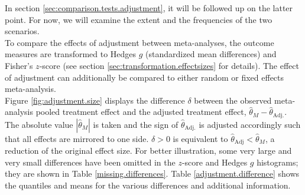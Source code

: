 In section \ref{sec:comparison.tests.adjustment}, it will be followed up on the latter point. For now, we will examine the extent and the frequencies of the two scenarios. \\
To compare the effects of adjustment between meta-analyses, the outcome measures are transformed to Hedges $g$ (standardized mean differences) and Fisher's $z$-score (see section \ref{sec:transformation.effectsizes} for details). The effect of adjustment can additionally be compared to either random or fixed effects meta-analysis. \\
Figure \ref{fig:adjustment.size} displays the difference $\delta$ between the observed meta-analysis pooled treatment effect and the adjusted treatment effect, $\hat{\theta}_M - \hat{\theta}_\textrm{Adj.}$. The absolute value $|\hat{\theta}_M|$ is taken and the sign of $\hat{\theta}_\textrm{Adj.}$ is adjusted accordingly such that all effects are mirrored to one side. $\delta > 0$ is equivalent to $\hat{\theta}_\textrm{Adj} < \hat{\theta}_M$, a reduction of the original effect size. For better illustration, some very large and very small differences have been omitted in the $z$-score and Hedges $g$ histograms; they are shown in Table \ref{missing.differences}. Table \ref{adjustment.difference} shows the quantiles and means for the various differences and additional information.\\

